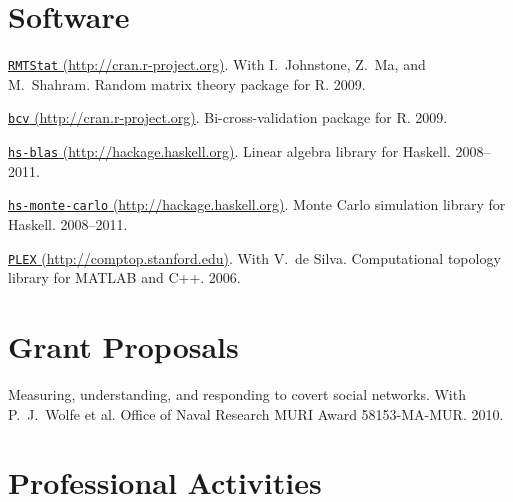 \documentclass[10pt,letterpaper]{article}
\renewenvironment{itemize}{
  \begin{list}{}{
    \setlength{\leftmargin}{1.5em}
    \setlength{\itemsep}{0.25em}
    \setlength{\parskip}{0pt}
    \setlength{\parsep}{0.25em}
  }
}{
  \end{list}
}
\begin{document}
\section*{Software}
\begin{itemize}
\item \href{http://cran.r-project.org/web/packages/RMTstat/index.html}
{\texttt{RMTStat} (http://cran.r-project.org)}.
With I.~Johnstone, Z.~Ma, and M.~Shahram.
Random matrix theory package for R.
2009.

\item \href{http://cran.r-project.org/web/packages/bcv/index.html}
{\texttt{bcv} (http://cran.r-project.org)}.
Bi-cross-validation package for R.
2009.

\item \href{http://hackage.haskell.org/cgi-bin/hackage-scripts/package/blas}
{\texttt{hs-blas} (http://hackage.haskell.org)}.
Linear algebra library for Haskell.
2008--2011.

\item \href{http://hackage.haskell.org/cgi-bin/hackage-scripts/package/monte-carlo}
{\texttt{hs-monte-carlo} (http://hackage.haskell.org)}.
Monte Carlo simulation library for Haskell.
2008--2011.

\item \href{http://comptop.stanford.edu/programs/plex.html}
{\texttt{PLEX} (http://comptop.stanford.edu)}.
With V.\ de Silva.
Computational topology library for \textsc{MATLAB} and C++.
2006.

\end{itemize}


\section*{Grant Proposals}
\begin{itemize}
  \item Measuring, understanding, and responding to covert social networks.
  With P.~J.~Wolfe et al.
  Office of Naval Research MURI Award 58153-MA-MUR.
  2010.
\end{itemize}


\section*{Professional Activities}
\end{document}
